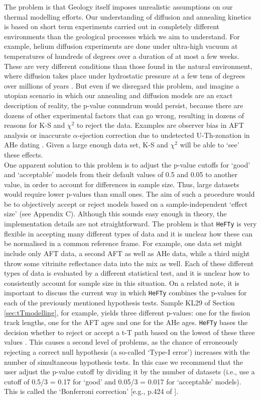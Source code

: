 \documentclass{article}
\begin{document}
The problem is that Geology itself imposes unrealistic assumptions on
our thermal modelling efforts. Our understanding of diffusion and
annealing kinetics is based on short term experiments carried out in
completely different environments than the geological processes which
we aim to understand. For example, helium diffusion experiments are
done under ultra-high vacuum at temperatures of hundreds of degrees
over a duration of at most a few weeks. These are very different
conditions than those found in the natural environment, where
diffusion takes place under hydrostatic pressure at a few tens of
degrees over millions of years \cite{villa2006}. But even if we
disregard this problem, and imagine a utopian scenario in which our
annealing and diffusion models are an exact description of reality,
the p-value conundrum would persist, because there are dozens of other
experimental factors that can go wrong, resulting in dozens of reasons
for K-S and $\chi^2$ to reject the data. Examples are observer bias in
AFT analysis \cite{ketcham2009} or inaccurate $\alpha$-ejection
correction due to undetected U-Th-zonation in AHe dating
\cite{hourigan2005}.  Given a large enough data set, K-S and $\chi^2$
will be able to `see' these effects.\\

One apparent solution to this problem is to adjust the p-value cutoffs
for `good' and `acceptable' models from their default values of 0.5
and 0.05 to another value, in order to account for differences in
sample size. Thus, large datasets would require lower p-values than
small ones. The aim of such a procedure would be to objectively accept
or reject models based on a sample-independent `effect size' (see
Appendix C). Although this sounds easy enough in theory, the
implementation details are not straightforward.  The problem is that
{\tt HeFTy} is very flexible in accepting many different types of data
and it is unclear how these can be normalised in a common reference
frame.  For example, one data set might include only AFT data, a
second AFT as well as AHe data, while a third might throw some
vitrinite reflectance data into the mix as well. Each of these
different types of data is evaluated by a different statistical test,
and it is unclear how to consistently account for sample size in this
situation. On a related note, it is important to discuss the current
way in which {\tt HeFTy} combines the p-values for each of the
previously mentioned hypothesis tests. Sample KL29 of Section
\ref{sec:tTmodelling}, for example, yields three different p-values:
one for the fission track lengths, one for the AFT ages and one for
the AHe ages. {\tt HeFTy} bases the decision whether to reject or
accept a t-T path based on the lowest of these three values
\cite{ketcham2005}. This causes a second level of problems, as the
chance of erroneously rejecting a correct null hypothesis (a so-called
`Type-I error') increases with the number of simultaneous hypothesis
tests. In this case we recommend that the user adjust the p-value
cutoff by dividing it by the number of datasets (i.e., use a cutoff of
0.5/3 = 0.17 for `good' and 0.05/3 = 0.017 for `acceptable'
models). This is called the `Bonferroni correction' [e.g., p.424
  of \cite{rice1995}].\\
\end{document}
